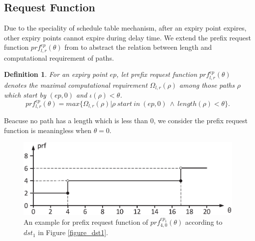 \documentclass[conference]{IEEEtran}
\newtheorem{definition}{Definition}
\begin{document}
\subsection{Request Function}\label{section_prf}
Due to the speciality of schedule table mechanism, after an expiry point expires, other expiry points cannot expire during delay time. We extend the prefix request function $prf^{ep}_{l,r}(\theta)$ from \cite{DBLP:journals/rts/Stigge015a}  to abstract the relation between length and computational requirement of paths.
\begin{definition}
For an expiry point $ep$, let prefix request function $prf^{ep}_{l,r}(\theta)$ denotes the maximal computational requirement $\Omega_{l,r}(\rho)$ among those paths $\rho$ which start by $(ep,0)$ and $\iota(\rho)<\theta$.
\begin{equation}
prf^{ep}_{l,r}(\theta)=max\{\Omega_{l,r}(\rho)|\rho \ start\ in\ (ep,0)\ \wedge\ length(\rho)<\theta\}.
\end{equation}\label{equation_prf}
\end{definition}

Beacuse no path has a length which is less than 0, we consider the prefix request function is meaningless when $\theta=0$.


\begin{figure}[t]
  \centering
  \includegraphics[scale=0.32]{graphics/figure_prf.eps}
  \caption{An example for prefix request function of $prf^{ep_1}_{4,0}(\theta)$ according to $dst_1$ in Figure \ref{figure_dst1}.} 
  \label{figure_prf}
\end{figure}
\end{document}

